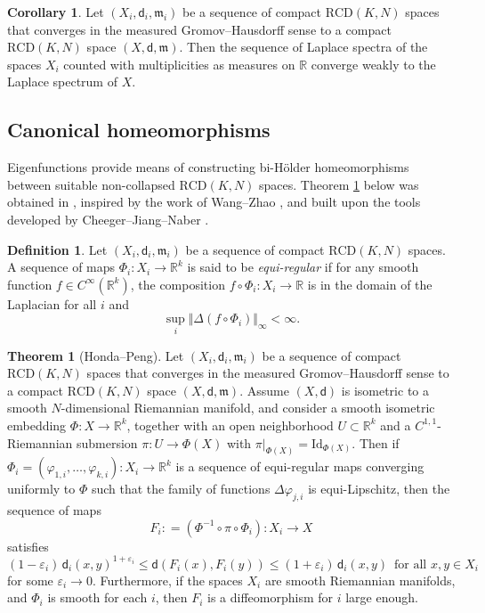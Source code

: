 \documentclass[12pt]{amsart}
\theoremstyle{definition}
\def\fnum{equation}
\newtheorem{theorem}[\fnum]{Theorem}
\newtheorem{corollary}[\fnum]{Corollary}
\newtheorem{definition}[\fnum]{Definition}
\numberwithin{equation}{section}
\newcommand{\Id}{\text{Id}}
\newcommand{\rcd}{\text{RCD}}
\newcommand{\mm}{\mathfrak{m}}
\newcommand{\R}{\mathbb{R}}
\begin{document}
\begin{corollary}\label{cor:spectrum-continuity}
 Let $(X_i, \mathsf{d}_i, \mm _i) $ be a sequence of compact $\rcd (K,N)$ spaces that converges in the measured Gromov--Hausdorff sense to a compact $\rcd (K,N)$ space $(X,\mathsf{d},\mm )$. Then the sequence of Laplace spectra of the spaces $X_i$ counted with multiplicities as measures on $\mathbb{R}$ converge weakly  to the Laplace spectrum of $X$.    
\end{corollary}


\subsection{Canonical homeomorphisms} Eigenfunctions provide means of constructing bi-H\"older homeomorphisms between suitable non-collapsed $\rcd (K,N)$ spaces.  Theorem \ref{thm:canonical-homeomorphism} below was obtained in  \cite[Theorem 1.2.2]{honda-peng}, inspired by the work of Wang--Zhao \cite{wang-zhao}, and built upon the tools developed by Cheeger--Jiang--Naber \cite{cheeger-jiang-naber}. 




\begin{definition}
    Let $(X_i, \mathsf{d}_i, \mm_i)$ be a sequence of compact $\rcd (K,N)$ spaces. A sequence of maps $\Phi_i  : X_i \to \mathbb{R}^k$ is said to be \emph{equi-regular} if for any smooth function $f \in C^{\infty} ( \mathbb{R}^k ) $, the composition $f \circ \Phi_i : X_i \to \R $ is in the domain of the Laplacian  for all $i$ and 
    \[     \sup_{i } \Vert  \Delta (f \circ \Phi_i ) \Vert _{\infty} < \infty  .  \]
\end{definition}

\begin{theorem}[Honda--Peng]\label{thm:canonical-homeomorphism}
Let $(X_i, \mathsf{d}_i, \mm _i) $ be a sequence of compact $\rcd (K,N)$ spaces that converges in the measured Gromov--Hausdorff sense to a compact $\rcd (K,N)$ space $(X,\mathsf{d},\mm )$.  Assume $(X,\mathsf{d})$ is isometric to a smooth $N$-dimensional Riemannian manifold, and consider a smooth isometric embedding $\Phi : X \to \mathbb{R}^k$, together with an open neighborhood $U \subset \mathbb{R}^k$ and a $C^{1,1}$-Riemannian submersion $\pi : U \to \Phi (X)$ with $\pi \vert _{\Phi (X)}= \Id _{\Phi (X)}$.   Then if $\Phi _i = (\varphi _{1,i}, \ldots , \varphi _{k, i} ) : X_i \to \mathbb{R}^k$ is a sequence of equi-regular maps converging uniformly to $\Phi$ such that the family of functions  $\Delta \varphi_{j,i} $ is equi-Lipschitz, then the sequence of maps 
\[ F_i : = (\Phi^{-1} \circ \pi \circ \Phi_i ) : X_i \to X\] 
satisfies
\[  (1 - \varepsilon _i ) \, \mathsf{d}_i( x,y ) ^{1 + \varepsilon_i} \leq \mathsf{d}( F_i (x), F_i (y)  ) \leq (1 + \varepsilon_i) \, \mathsf{d}_i(x,y) \, \text{ for all } x,y \in X_i   \]
for some $\varepsilon _i \to 0$. Furthermore, if the spaces $X_i$ are smooth Riemannian manifolds, and $\Phi_i $ is smooth for each $i$, then $F_i$ is a diffeomorphism for $i$ large enough. 
\end{theorem}
\end{document}
